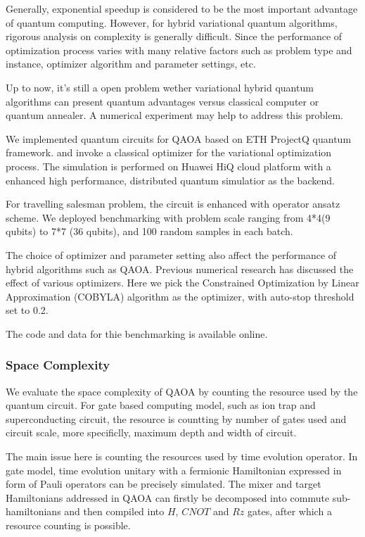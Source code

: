 \documentclass[aps,pra,twocolumn,superscriptaddress]{revtex4-2}
\begin{document}
Generally, exponential speedup is considered to be the most important advantage of quantum computing. However, for hybrid variational quantum algorithms, rigorous analysis on complexity is generally difficult. Since the performance of optimization process varies with many relative factors such as problem type and instance, optimizer algorithm and parameter settings, etc. 

Up to now, it's still a open problem wether variational hybrid quantum algorithms can present quantum advantages versus classical computer or quantum annealer. A numerical experiment may help to address this problem.

We implemented quantum circuits for QAOA based on ETH ProjectQ quantum framework\cite{}. and invoke a classical optimizer for the variational optimization process. The simulation is performed on Huawei HiQ cloud platform\cite{} with a enhanced high performance, distributed quantum simulatior as the backend. 

For travelling salesman problem, the circuit is enhanced with operator ansatz scheme. We deployed benchmarking with problem scale ranging from 4*4(9 qubits) to 7*7 (36 qubits), and 100 random samples in each batch. 

The choice of optimizer and parameter setting also affect the performance of hybrid algorithms such as QAOA. Previous numerical research has discussed the effect of various optimizers\cite{}. Here we pick the Constrained Optimization by Linear Approximation (COBYLA) algorithm as the optimizer, with auto-stop threshold set to 0.2.


The code and data for thie benchmarking is available online\cite{}.


\subsubsection{Space Complexity}
We evaluate the space complexity of QAOA by counting the resource used by the quantum circuit\cite{}. For gate based computing model, such as ion trap and superconducting circuit\cite{}, the resource is countting by number of gates used and circuit scale, more specificlly, maximum depth and width of circuit.  

The main issue here is counting the resources used by time evolution operator. In gate model, time evolution unitary with a fermionic Hamiltonian expressed in form of Pauli operators can be precisely simulated\cite{}. %
The mixer and target Hamiltonians addressed in QAOA can firstly be decomposed into commute sub-hamiltonians and then compiled into $H$, $CNOT$ and $Rz$ gates, after which a resource counting is possible. %
\end{document}
